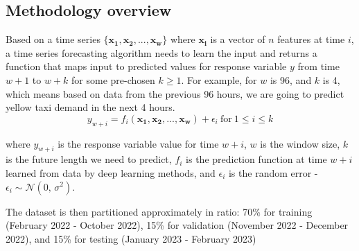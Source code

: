 \documentclass[11pt]{article}
\begin{document}
\subsection{Methodology overview}
  Based on a time series \begin{math}\{\boldsymbol{x_{1}}, \boldsymbol{x_{2}},..., \boldsymbol{x_{w}}\}\end{math} where $\boldsymbol{x_{i}}$ is a vector of $n$ features at time $i$, a time series forecasting algorithm needs to learn the input and returns a function that maps input to predicted values for response variable $y$ from time $w + 1$ to $w+k$ for some pre-chosen $k\ge1$. For example, for $w$ is 96, and $k$ is 4, which means based on data from the previous 96 hours, we are going to predict yellow taxi demand in the next 4 hours.
\begin{equation}
    {y}_{w+i} = f_{i}(\boldsymbol{x_{1}},\boldsymbol{x_{2}},...,\boldsymbol{x_{w}}) + \epsilon_{i} \    \text{for} \    1\leq i \leq k\end{equation}

where ${y}_{w+i}$ is the response variable value for time $w+i$, $w$ is the window size, $k$ is the future length we need to predict, $f_{i}$ is the prediction function at time $w+i$ learned from data by deep learning methods, and $\epsilon_{i}$ is the random error - $\epsilon_{i} \sim \mathcal{N}(0,\,\sigma^{2})$. 

The dataset is then partitioned approximately in ratio: 70\% for training (February 2022 - October 2022), 15\% for validation (November 2022 - December 2022), and 15\% for testing (January 2023 - February 2023)
\end{document}
